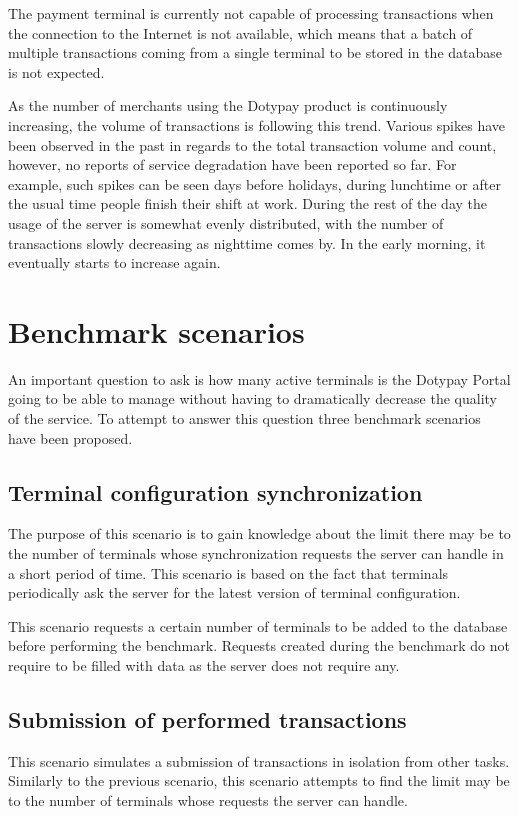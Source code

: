 \documentclass[12pt, a4paper]{article}
\let\oldsection\section
\renewcommand\section{\clearpage\oldsection}
\begin{document}
The payment terminal is currently not capable of processing transactions when the connection to the Internet is not available, which means that a batch of multiple transactions coming from a single terminal to be stored in the database is not expected. 

As the number of merchants using the Dotypay product is continuously increasing, the volume of transactions is following this trend.
Various spikes have been observed in the past in regards to the total transaction volume and count, however, no reports of service degradation have been reported so far.
For example, such spikes can be seen days before holidays, during lunchtime or after the usual time people finish their shift at work. During the rest of the day the usage of the server is somewhat evenly distributed, with the number of transactions slowly decreasing as nighttime comes by. 
In the early morning, it eventually starts to increase again.

\section{Benchmark scenarios}

An important question to ask is how many active terminals is the Dotypay Portal going to be able to manage without having to dramatically decrease the quality of the service. To attempt to answer this question three benchmark scenarios have been proposed.

\subsection{Terminal configuration synchronization}
The purpose of this scenario is to gain knowledge about the limit there may be to the number of terminals whose synchronization requests the server can handle in a short period of time. This scenario is based on the fact that terminals periodically ask the server for the latest version of terminal configuration. 

This scenario requests a certain number of terminals to be added to the database before performing the benchmark.
Requests created during the benchmark do not require to be filled with data as the server does not require any. 

\subsection{Submission of performed transactions}
This scenario simulates a submission of transactions in isolation from other tasks. Similarly to the previous scenario, this scenario attempts to find the limit may be to the number of terminals whose requests the server can handle.
\end{document}
